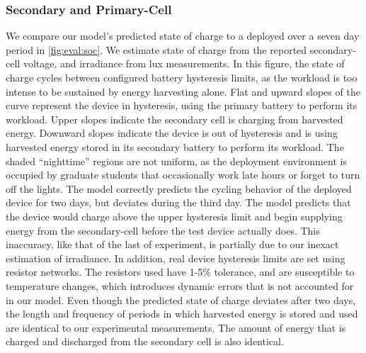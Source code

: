 \subsubsection{Secondary and Primary-Cell}
We compare our model's predicted state of charge to a deployed \name over a seven
day period in \cref{fig:eval:soc}. We estimate state of charge from the reported secondary-cell
voltage,
and irradiance from
lux measurements. In this figure, the state of
charge cycles between configured battery hysteresis limits, as the workload is
too intense to be sustained by energy harvesting alone.
Flat and upward slopes of the curve represent the
device in hysteresis, using the primary battery to perform its workload. Upper slopes
indicate the secondary cell is charging from harvested energy.
Downward slopes indicate the device is out of hysteresis and is using harvested
energy stored in its secondary battery to perform its workload.
The shaded ``nighttime'' regions are not uniform, as the
deployment environment is occupied by graduate students that occasionally work
late hours or forget to turn off the lights.  The model correctly predicts the
cycling
behavior of the deployed device for two days, but deviates
during the third day. The model predicts that the device would charge above the upper
hysteresis limit and begin supplying energy from the secondary-cell before the
test device actually does.  This inaccuracy, like that of the last of
experiment, is partially due to our inexact estimation of irradiance.  In
addition, real device hysteresis limits are set using resistor networks.  The
resistors used have 1-5\% tolerance, and are susceptible to temperature
changes, which introduces dynamic errors that is not accounted for in our model.
Even though the predicted state of charge deviates after two days, the length
and frequency of periods in which harvested energy is stored and used %
are identical to our experimental measurements. 
The amount of energy that is charged and discharged from the secondary cell is also identical.
